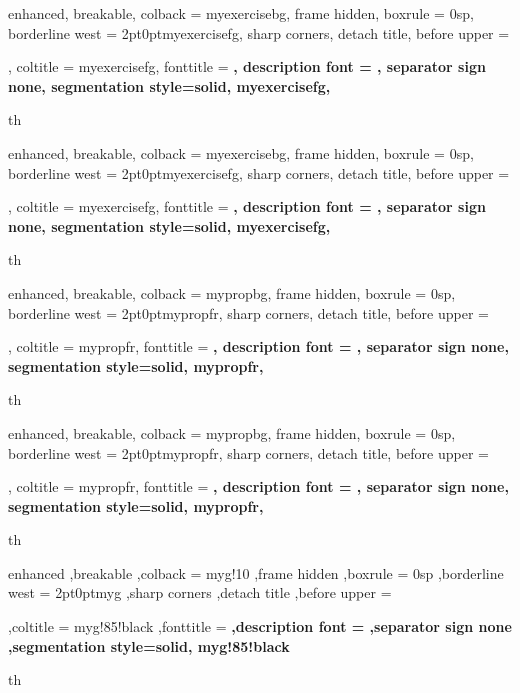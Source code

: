 
{%
	enhanced,
	breakable,
	colback = myexercisebg,
	frame hidden,
	boxrule = 0sp,
	borderline west = {2pt}{0pt}{myexercisefg},
	sharp corners,
	detach title,
	before upper = \tcbtitle\par\smallskip,
	coltitle = myexercisefg,
	fonttitle = \bfseries\sffamily,
	description font = \mdseries,
	separator sign none,
	segmentation style={solid, myexercisefg},
}
{th}

{%
	enhanced,
	breakable,
	colback = myexercisebg,
	frame hidden,
	boxrule = 0sp,
	borderline west = {2pt}{0pt}{myexercisefg},
	sharp corners,
	detach title,
	before upper = \tcbtitle\par\smallskip,
	coltitle = myexercisefg,
	fonttitle = \bfseries\sffamily,
	description font = \mdseries,
	separator sign none,
	segmentation style={solid, myexercisefg},
}
{th}



{%
	enhanced,
	breakable,
	colback = mypropbg,
	frame hidden,
	boxrule = 0sp,
	borderline west = {2pt}{0pt}{mypropfr},
	sharp corners,
	detach title,
	before upper = \tcbtitle\par\smallskip,
	coltitle = mypropfr,
	fonttitle = \bfseries\sffamily,
	description font = \mdseries,
	separator sign none,
	segmentation style={solid, mypropfr},
}
{th}

{%
	enhanced,
	breakable,
	colback = mypropbg,
	frame hidden,
	boxrule = 0sp,
	borderline west = {2pt}{0pt}{mypropfr},
	sharp corners,
	detach title,
	before upper = \tcbtitle\par\smallskip,
	coltitle = mypropfr,
	fonttitle = \bfseries\sffamily,
	description font = \mdseries,
	separator sign none,
	segmentation style={solid, mypropfr},
}
{th}



{%
	enhanced
	,breakable
	,colback = myg!10
	,frame hidden
	,boxrule = 0sp
	,borderline west = {2pt}{0pt}{myg}
	,sharp corners
	,detach title
	,before upper = \tcbtitle\par\smallskip
	,coltitle = myg!85!black
	,fonttitle = \bfseries\sffamily
	,description font = \mdseries
	,separator sign none
	,segmentation style={solid, myg!85!black}
}
{th}



